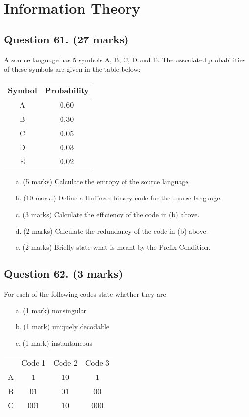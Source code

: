 \documentclass[a4paper,12pt]{article}
\begin{document}
\section{Information Theory}

\subsection*{Question 61. (27 marks) }
A source language has 5 symbols A, B, C, D and E. The associated
probabilities of these symbols are given in the table below:
\begin{center}
	\begin{tabular}{|c|c|}
		\hline
		Symbol & Probability \\ \hline
		A & 0.60 \\
		B & 0.30 \\
		C & 0.05 \\
		D & 0.03 \\
		E & 0.02 \\
		\hline
	\end{tabular}
\end{center}

\begin{itemize}
	\item[a.](5 marks) Calculate the entropy of the source language.
	\item[b.](10 marks) Define a Huffman binary code for the source language.
	\item[c.](3 marks) Calculate the efficiency of the code in (b) above.
	\item[d.](2 marks) Calculate the redundancy of the code in (b) above.
	\item[e.](2 marks) Briefly state what is meant by the Prefix Condition.
\end{itemize}

\subsection*{Question 62. (3 marks) } For each of the following codes state whether they are
\begin{itemize}
	\item[a.] (1 mark) nonsingular
	\item[b.] (1 mark) uniquely decodable
	\item[c.] (1 mark) instantaneous
\end{itemize}
\begin{center}
	\begin{tabular}{|c|c|c|c|}
		\hline
		& Code 1 & Code 2 & Code 3 \\
		A & 1 & 10 & 1 \\
		B & 01 & 01 & 00 \\
		C & 001 & 10 & 000 \\
		\hline
	\end{tabular}
\end{center}
\end{document}
